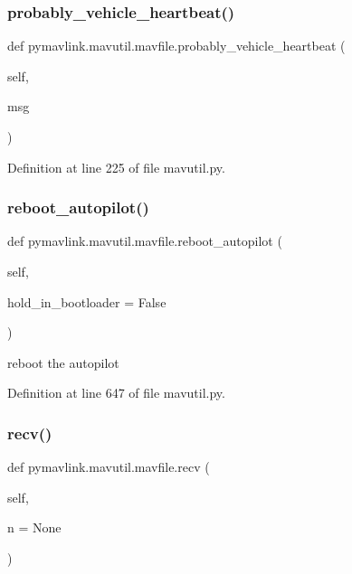 \subsubsection{\texorpdfstring{probably\_vehicle\_heartbeat()}{probably\_vehicle\_heartbeat()}}
{\footnotesize\ttfamily def pymavlink.\+mavutil.\+mavfile.\+probably\+\_\+vehicle\+\_\+heartbeat (\begin{DoxyParamCaption}\item[{}]{self,  }\item[{}]{msg }\end{DoxyParamCaption})}



Definition at line 225 of file mavutil.\+py.

\mbox{\label{classpymavlink_1_1mavutil_1_1mavfile_ae1f8a428d88379acbdbdd0bcc0f81106}} 
\subsubsection{\texorpdfstring{reboot\_autopilot()}{reboot\_autopilot()}}
{\footnotesize\ttfamily def pymavlink.\+mavutil.\+mavfile.\+reboot\+\_\+autopilot (\begin{DoxyParamCaption}\item[{}]{self,  }\item[{}]{hold\+\_\+in\+\_\+bootloader = {\ttfamily False} }\end{DoxyParamCaption})}

\begin{DoxyVerb}reboot the autopilot\end{DoxyVerb}
 

Definition at line 647 of file mavutil.\+py.

\mbox{\label{classpymavlink_1_1mavutil_1_1mavfile_a09cb800fc6b03949ace05ce320539be2}} 
\subsubsection{\texorpdfstring{recv()}{recv()}}
{\footnotesize\ttfamily def pymavlink.\+mavutil.\+mavfile.\+recv (\begin{DoxyParamCaption}\item[{}]{self,  }\item[{}]{n = {\ttfamily None} }\end{DoxyParamCaption})}

